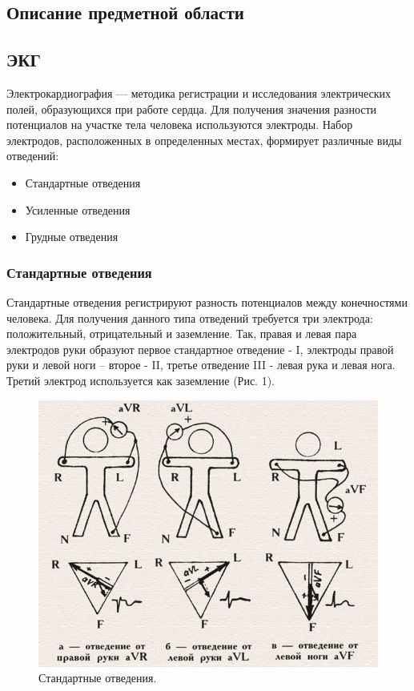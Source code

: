 \documentclass[12pt, russian]{extarticle}
\begin{document}
\begin{spacing}{1.5}
\newpage
\section{Описание предметной области}

\subsection{ЭКГ}

Электрокардиография — методика регистрации и исследования электрических полей, образующихся при работе сердца. Для получения значения разности потенциалов на участке тела человека используются электроды. Набор электродов, расположенных в определенных местах, формирует различные виды отведений:

\begin{itemize}
    \item Стандартные отведения
    \item Усиленные отведения
    \item Грудные отведения
\end{itemize}

\subsubsection{Стандартные отведения}

Стандартные отведения регистрируют разность потенциалов между конечностями человека. Для получения данного типа отведений требуется три электрода: положительный, отрицательный и заземление. Так, правая и левая пара электродов руки образуют первое стандартное отведение - I, электроды правой руки и левой ноги – второе - II, третье отведение III - левая рука и левая нога. Третий электрод используется как заземление (Рис. 1).

\begin{figure}[htbp]
\centering
\includegraphics[scale=0.44]{resources/отведения экг.jpg}
\caption{Стандартные отведения.}
\end{figure}


\end{spacing}
\end{document}
